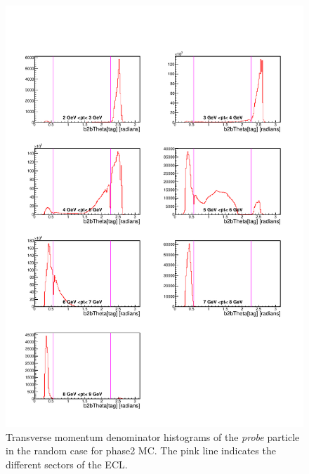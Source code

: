 \documentclass[a4paper,11pt,twosided,final,german,openbib,pdftex,listof=totoc,bibliography=totoc]{scrbook}
\begin{document}
\begin{appendix}
\begin{figure}[!htbp]
	\centering
	\includegraphics[width=\textwidth]{Plots/master/xPMThetaRandomD_MC}
	\caption[Transverse Momentum $\theta$ Random Denominator Histogram Phase2 MC]{Transverse momentum denominator histograms of the \textit{probe} particle in the random case for phase2 MC. The pink line indicates the different sectors of the ECL.}
	\label{plt:PtMThetaRandomD_MC}
\end{figure}



\end{appendix}
\end{document}
